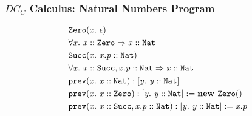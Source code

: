 \begin{frame}
\frametitle{$DC_C$ Calculus: Natural Numbers Program}

\begin{align*}
&\constr{\texttt{Zero}}{x}{\epsilon}\\
&\progEnt{x}{\instOf{x}{\texttt{Zero}}}{\instOf{x}{\texttt{Nat}}}\\
&\constr{\texttt{Succ}}{x}{\instOf{x.p}{\texttt{Nat}}}\\
&\progEnt{x}{\instOf{x}{\texttt{Succ}}, \instOf{x.p}{\texttt{Nat}}}{\instOf{x}{\texttt{Nat}}}\\
&\mDecl{\texttt{prev}}{x}{\instOf{x}{\texttt{Nat}}}{\type{y}{\instOf{y}{\texttt{Nat}}}}\\
&\mImpl{\texttt{prev}}{x}{\instOf{x}{\texttt{Zero}}}{\type{y}{\instOf{y}{\texttt{Nat}}}}{\newInstNoArgs{\texttt{Zero}}}\\
&\mImpl{\texttt{prev}}{x}{\instOf{x}{\texttt{Succ}}, \instOf{x.p}{\texttt{Nat}}}{\type{y}{\instOf{y}{\texttt{Nat}}}}{x.p}
\end{align*}
\end{frame}
